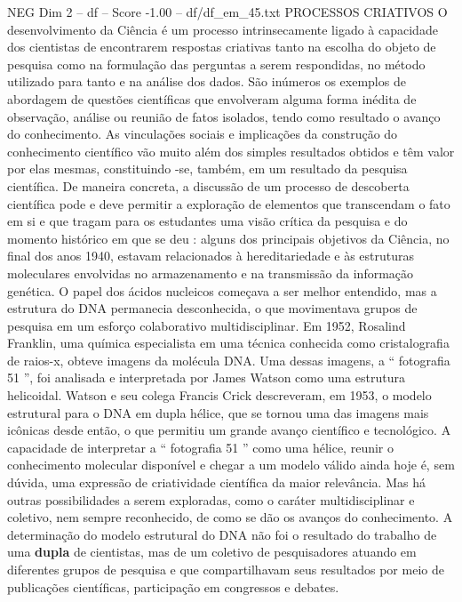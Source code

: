 \begin{textsample}{NEG Dim 2 – df – Score -1.00 – df/df\_em\_45.txt}  \label{ex:f2_neg_162}
PROCESSOS CRIATIVOS O desenvolvimento da Ciência é um processo intrinsecamente ligado à capacidade dos cientistas de encontrarem respostas criativas tanto na escolha do objeto de pesquisa como na formulação das perguntas a serem respondidas, no método utilizado para tanto e na análise dos dados.
São inúmeros os exemplos de abordagem de questões científicas que envolveram alguma forma inédita de observação, análise ou reunião de fatos isolados, tendo como resultado o avanço do conhecimento.
As vinculações sociais e implicações da construção do conhecimento científico vão muito além dos simples resultados obtidos e têm valor por elas mesmas, constituindo -se, também, em um resultado da pesquisa científica.
De maneira concreta, a discussão de um processo de descoberta científica pode e deve permitir a exploração de elementos que transcendam o fato em si e que tragam para os estudantes uma visão crítica da pesquisa e do momento histórico em que se deu : alguns dos principais objetivos da Ciência, no final dos anos 1940, estavam relacionados à hereditariedade e às estruturas moleculares envolvidas no armazenamento e na transmissão da informação genética.
O papel dos ácidos nucleicos começava a ser melhor entendido, mas a estrutura do DNA permanecia desconhecida, o que movimentava grupos de pesquisa em um esforço colaborativo multidisciplinar.
Em 1952, Rosalind Franklin, uma química especialista em uma técnica conhecida como cristalografia de raios-x, obteve imagens da molécula DNA.
Uma dessas imagens, a “ fotografia 51 ”, foi analisada e interpretada por James Watson como uma estrutura helicoidal.
Watson e seu colega Francis Crick descreveram, em 1953, o modelo estrutural para o DNA em dupla hélice, que se tornou uma das imagens mais icônicas desde então, o que permitiu um grande avanço científico e tecnológico.
A capacidade de interpretar a “ fotografia 51 ” como uma hélice, reunir o conhecimento molecular disponível e chegar a um modelo válido ainda hoje é, sem dúvida, uma expressão de criatividade científica da maior relevância.
Mas há outras possibilidades a serem exploradas, como o caráter multidisciplinar e coletivo, nem sempre reconhecido, de como se dão os avanços do conhecimento.
A determinação do modelo estrutural do DNA não foi o resultado do trabalho de uma \textbf{dupla} de cientistas, mas de um coletivo de pesquisadores atuando em diferentes grupos de pesquisa e que compartilhavam seus resultados por meio de publicações científicas, participação em congressos e debates.

\end{textsample}
